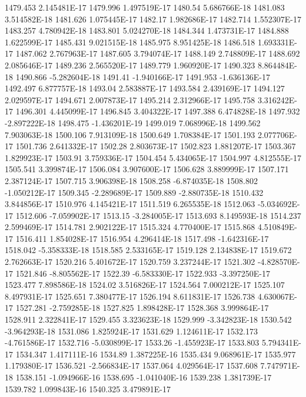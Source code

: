 1479.453  2.145481E-17
1479.996  1.497519E-17
1480.54  5.686766E-18
1481.083  3.514582E-18
1481.626  1.075445E-17
1482.17  1.982686E-17
1482.714  1.552307E-17
1483.257  4.780942E-18
1483.801  5.024270E-18
1484.344  1.473731E-17
1484.888  1.622599E-17
1485.431  9.021515E-18
1485.975  8.951425E-18
1486.518  1.693331E-17
1487.062  2.767963E-17
1487.605  3.794074E-17
1488.149  2.748809E-17
1488.692  2.085646E-17
1489.236  2.565520E-17
1489.779  1.960920E-17
1490.323  8.864484E-18
1490.866  -5.282604E-18
1491.41  -1.940166E-17
1491.953  -1.636136E-17
1492.497  6.877757E-18
1493.04  2.583887E-17
1493.584  2.439169E-17
1494.127  2.029597E-17
1494.671  2.007873E-17
1495.214  2.312966E-17
1495.758  3.316242E-17
1496.301  4.445099E-17
1496.845  3.404322E-17
1497.388  6.474828E-18
1497.932  -2.897222E-18
1498.475  -1.436201E-19
1499.019  7.068996E-18
1499.562  7.903063E-18
1500.106  7.913109E-18
1500.649  1.708384E-17
1501.193  2.077706E-17
1501.736  2.641332E-17
1502.28  2.803673E-17
1502.823  1.881207E-17
1503.367  1.829923E-17
1503.91  3.759336E-17
1504.454  5.434065E-17
1504.997  4.812555E-17
1505.541  3.399874E-17
1506.084  3.907600E-17
1506.628  3.889999E-17
1507.171  2.387124E-17
1507.715  3.906398E-18
1508.258  -6.874035E-18
1508.802  -1.050212E-17
1509.345  -2.289689E-17
1509.889  -2.880735E-18
1510.432  3.844856E-17
1510.976  4.145421E-17
1511.519  6.265535E-18
1512.063  -5.034692E-17
1512.606  -7.059902E-17
1513.15  -3.284005E-17
1513.693  8.149593E-18
1514.237  2.599469E-17
1514.781  2.902122E-17
1515.324  4.770400E-17
1515.868  4.510849E-17
1516.411  1.854028E-17
1516.954  4.296414E-18
1517.498  -1.642316E-17
1518.042  -5.358333E-18
1518.585  2.533165E-17
1519.128  2.134838E-17
1519.672  2.762663E-17
1520.216  5.401672E-17
1520.759  3.237244E-17
1521.302  -4.828570E-17
1521.846  -8.805562E-17
1522.39  -6.583330E-17
1522.933  -3.397250E-17
1523.477  7.898586E-18
1524.02  3.516826E-17
1524.564  7.000212E-17
1525.107  8.497931E-17
1525.651  7.380477E-17
1526.194  8.611831E-17
1526.738  4.630067E-17
1527.281  -2.759285E-18
1527.825  1.898428E-17
1528.368  3.999864E-17
1528.911  2.322841E-17
1529.455  3.323623E-18
1529.999  -3.342823E-18
1530.542  -3.964293E-18
1531.086  1.825924E-17
1531.629  1.124611E-17
1532.173  -4.761586E-17
1532.716  -5.030899E-17
1533.26  -1.455923E-17
1533.803  5.794341E-17
1534.347  1.417111E-16
1534.89  1.387225E-16
1535.434  9.068961E-17
1535.977  1.179380E-17
1536.521  -2.566834E-17
1537.064  4.029564E-17
1537.608  7.747971E-18
1538.151  -1.094966E-16
1538.695  -1.041040E-16
1539.238  1.381739E-17
1539.782  1.099843E-16
1540.325  3.479891E-17

